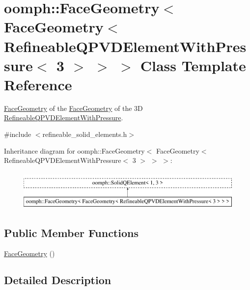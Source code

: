 \hypertarget{classoomph_1_1FaceGeometry_3_01FaceGeometry_3_01RefineableQPVDElementWithPressure_3_013_01_4_01_4_01_4}{}\section{oomph\+:\+:Face\+Geometry$<$ Face\+Geometry$<$ Refineable\+Q\+P\+V\+D\+Element\+With\+Pressure$<$ 3 $>$ $>$ $>$ Class Template Reference}
\label{classoomph_1_1FaceGeometry_3_01FaceGeometry_3_01RefineableQPVDElementWithPressure_3_013_01_4_01_4_01_4}


\hyperlink{classoomph_1_1FaceGeometry}{Face\+Geometry} of the \hyperlink{classoomph_1_1FaceGeometry}{Face\+Geometry} of the 3D \hyperlink{classoomph_1_1RefineableQPVDElementWithPressure}{Refineable\+Q\+P\+V\+D\+Element\+With\+Pressure}.  




{\ttfamily \#include $<$refineable\+\_\+solid\+\_\+elements.\+h$>$}

Inheritance diagram for oomph\+:\+:Face\+Geometry$<$ Face\+Geometry$<$ Refineable\+Q\+P\+V\+D\+Element\+With\+Pressure$<$ 3 $>$ $>$ $>$\+:\begin{figure}[H]
\begin{center}
\leavevmode
\includegraphics[height=2.000000cm]{classoomph_1_1FaceGeometry_3_01FaceGeometry_3_01RefineableQPVDElementWithPressure_3_013_01_4_01_4_01_4}
\end{center}
\end{figure}
\subsection*{Public Member Functions}
\begin{DoxyCompactItemize}
\item 
\hyperlink{classoomph_1_1FaceGeometry_3_01FaceGeometry_3_01RefineableQPVDElementWithPressure_3_013_01_4_01_4_01_4_a8eb393e24d2d6006b0ce8b7a72a356f7}{Face\+Geometry} ()
\end{DoxyCompactItemize}


\subsection{Detailed Description}

